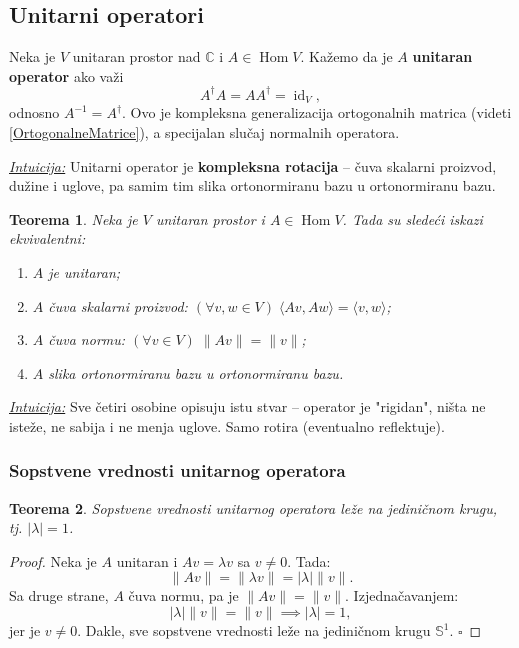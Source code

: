 \documentclass[a4paper,12pt,twoside]{report}
\newtheorem{theorem}{Teorema}[section]
\numberwithin{algorithm}{section}
\begin{document}
\newpage


\subsection{Unitarni operatori}
\label{UnitarniOperatori}

Neka je $V$ unitaran prostor nad $\mathbb{C}$ i $A \in \operatorname{Hom} V$. Kažemo da je $A$ \textbf{unitaran operator} ako važi
\[
    A^\dagger A = A A^\dagger = \operatorname{id}_V,
\]
odnosno $A^{-1} = A^\dagger$. 
Ovo je kompleksna generalizacija ortogonalnih matrica (videti \ref{OrtogonalneMatrice}), a specijalan slučaj normalnih operatora.

\medskip
\noindent\underline{\textit{Intuicija:}} Unitarni operator je \textbf{kompleksna rotacija} – čuva skalarni proizvod, dužine i uglove, pa samim tim slika ortonormiranu bazu u ortonormiranu bazu.

\begin{theorem}
    Neka je $V$ unitaran prostor i $A \in \operatorname{Hom} V$. Tada su sledeći iskazi ekvivalentni:
    \begin{enumerate}
        \item $A$ je unitaran;
        \item $A$ čuva skalarni proizvod: $(\forall v, w \in V) \; \langle Av, Aw \rangle = \langle v, w \rangle$;
        \item $A$ čuva normu: $(\forall v \in V) \; \|Av\| = \|v\|$;
        \item $A$ slika ortonormiranu bazu u ortonormiranu bazu.
    \end{enumerate}
\end{theorem}

\noindent\underline{\textit{Intuicija:}} Sve četiri osobine opisuju istu stvar – operator je "rigidan", ništa ne isteže, ne sabija i ne menja uglove. Samo rotira (eventualno reflektuje).

\subsubsection{Sopstvene vrednosti unitarnog operatora}

\begin{theorem}
    Sopstvene vrednosti unitarnog operatora leže na jediničnom krugu, tj. $|\lambda| = 1$.
\end{theorem}
\begin{proof}
    Neka je $A$ unitaran i $Av = \lambda v$ sa $v \neq 0$. Tada:
    \[
        \|Av\| = \|\lambda v\| = |\lambda| \|v\|.
    \]
    Sa druge strane, $A$ čuva normu, pa je $\|Av\| = \|v\|$. Izjednačavanjem:
    \[
        |\lambda| \|v\| = \|v\| \implies |\lambda| = 1,
    \]
    jer je $v \neq 0$. Dakle, sve sopstvene vrednosti leže na jediničnom krugu $\mathbb{S}^1$. \(\square\)
\end{proof}
\end{document}
